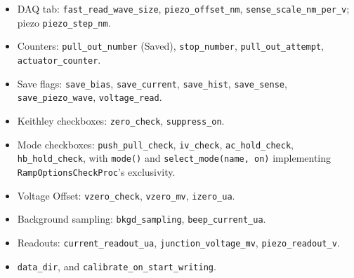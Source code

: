 \begin{itemize}[leftmargin=*]
\item DAQ tab: \texttt{fast\_\discretionary{}{}{}read\_\discretionary{}{}{}wave\_\discretionary{}{}{}size}, \texttt{piezo\_\discretionary{}{}{}offset\_\discretionary{}{}{}nm}, \texttt{sense\_\discretionary{}{}{}scale\_\discretionary{}{}{}nm\_\discretionary{}{}{}per\_\discretionary{}{}{}v}; piezo \texttt{piezo\_\discretionary{}{}{}step\_\discretionary{}{}{}nm}.
\item Counters: \texttt{pull\_\discretionary{}{}{}out\_\discretionary{}{}{}number} (Saved), \texttt{stop\_\discretionary{}{}{}number}, \texttt{pull\_\discretionary{}{}{}out\_\discretionary{}{}{}attempt}, \texttt{actuator\_\discretionary{}{}{}counter}.
\item Save flags: \texttt{save\_\discretionary{}{}{}bias}, \texttt{save\_\discretionary{}{}{}current}, \texttt{save\_\discretionary{}{}{}hist}, \texttt{save\_\discretionary{}{}{}sense}, \texttt{save\_\discretionary{}{}{}piezo\_\discretionary{}{}{}wave}, \texttt{voltage\_\discretionary{}{}{}read}.
\item Keithley checkboxes: \texttt{zero\_\discretionary{}{}{}check}, \texttt{suppress\_\discretionary{}{}{}on}.
\item Mode checkboxes: \texttt{push\_\discretionary{}{}{}pull\_\discretionary{}{}{}check}, \texttt{iv\_\discretionary{}{}{}check}, \texttt{ac\_\discretionary{}{}{}hold\_\discretionary{}{}{}check}, \texttt{hb\_\discretionary{}{}{}hold\_\discretionary{}{}{}check}, with \texttt{mode()} and \texttt{select\_\discretionary{}{}{}mode(name,\discretionary{}{}{} on)} implementing \texttt{Ramp\discretionary{}{}{}Options\discretionary{}{}{}Check\discretionary{}{}{}Proc}'s exclusivity.
\item Voltage Offset: \texttt{vzero\_\discretionary{}{}{}check}, \texttt{vzero\_\discretionary{}{}{}mv}, \texttt{izero\_\discretionary{}{}{}ua}.
\item Background sampling: \texttt{bkgd\_\discretionary{}{}{}sampling}, \texttt{beep\_\discretionary{}{}{}current\_\discretionary{}{}{}ua}.
\item Readouts: \texttt{current\_\discretionary{}{}{}readout\_\discretionary{}{}{}ua}, \texttt{junction\_\discretionary{}{}{}voltage\_\discretionary{}{}{}mv}, \texttt{piezo\_\discretionary{}{}{}readout\_\discretionary{}{}{}v}.
\item \texttt{data\_\discretionary{}{}{}dir}, and \texttt{calibrate\_\discretionary{}{}{}on\_\discretionary{}{}{}start\_\discretionary{}{}{}writing}.
\end{itemize}

